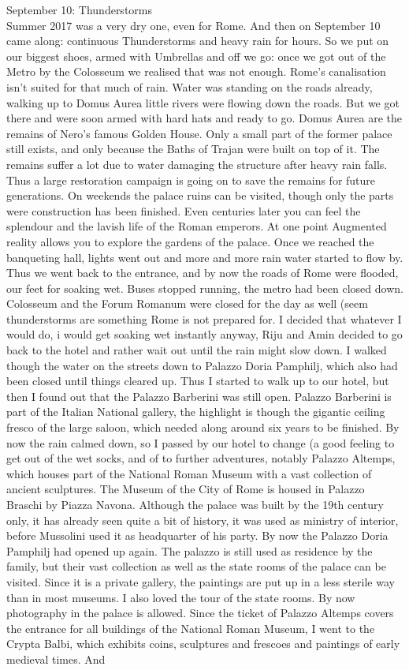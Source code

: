 September 10: Thunderstorms\\
Summer 2017 was a very dry one, even for Rome. And then on September 10 came along: continuous Thunderstorms and heavy rain for hours. So we put on our biggest shoes, armed with Umbrellas and off we go: once we got out of the Metro by the Colosseum we realised that was not enough. Rome's canalisation isn't suited for that much of rain. Water was standing on the roads already, walking up to Domus Aurea little rivers were flowing down the roads. But we got there and were soon armed with hard hats and ready to go. Domus Aurea are the remains of Nero's famous Golden House. Only a small part of the former palace still exists, and only because the Baths of Trajan were built on top of it. The remains suffer a lot due to water damaging the structure after heavy rain falls. Thus a large restoration campaign is going on to save the remains for future generations. On weekends the palace ruins can be visited, though only the parts were construction has been finished. Even centuries later you can feel the splendour and the lavish life of the Roman emperors. At one point Augmented reality allows you to explore the gardens of the palace. Once we reached the banqueting hall, lights went out and more and more rain water started to flow by. Thus we went back to the entrance, and by now the roads of Rome were flooded, our feet for soaking wet. Buses stopped running, the metro had been closed down. Colosseum and the Forum Romanum were closed for the day as well (seem thunderstorms are something Rome is not prepared for. I decided that whatever I would do, i would get soaking wet instantly anyway, Riju and Amin decided to go back to the hotel and rather wait out until the rain might slow down. I walked though the water on the streets down to Palazzo Doria Pamphilj, which also had been closed until things cleared up. Thus I started to walk up to our hotel, but then I found out that the Palazzo Barberini was still open. Palazzo Barberini is part of the Italian National gallery, the highlight is though the gigantic ceiling fresco of the large saloon, which needed along around six years to be finished. By now the rain calmed down, so I passed by our hotel to change (a good feeling to get out of the wet socks, and of to further adventures, notably Palazzo Altemps, which houses part of the National Roman Museum with a vast collection of ancient sculptures. The Museum of the City of Rome is housed in Palazzo Braschi by Piazza Navona. Although the palace was built by the 19th century only, it has already seen quite a bit of history, it was used as ministry of interior, before Mussolini used it as headquarter of his party. By now the Palazzo Doria Pamphilj had opened up again. The palazzo is still used as residence by the family, but their vast collection as well as the state rooms of the palace can be visited. Since it is a private gallery, the paintings are put up in a less sterile way than in most museums. I also loved the tour of the state rooms. By now photography in the palace is allowed. Since the ticket of Palazzo Altemps covers the entrance for all buildings of the National Roman Museum, I went to the Crypta Balbi, which exhibits coins, sculptures and frescoes and paintings of early medieval times. And 